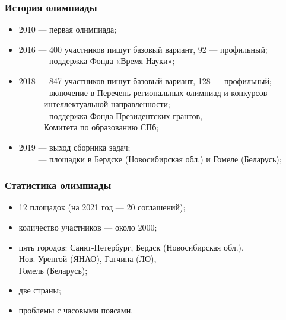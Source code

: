 % 

\begin{frame}\frametitle{История олимпиады}
\begin{itemize}
	\item 2010 — первая олимпиада;
	\item 2016 — 400 участников пишут базовый вариант, 92 --- профильный;\\
        $\phantom{2016}$ — поддержка Фонда «Время Науки»;
	\item 2018 — 847 участников пишут базовый вариант, 128 --- профильный;\\
        $\phantom{2018}$ — включение в Перечень региональных олимпиад и конкурсов\\
	$\phantom{2018 — }$\quad интеллектуальной направленности;\\
	$\phantom{2018}$ — поддержка Фонда Президентских грантов,\\
	$\phantom{2018 — }$\quad Комитета по образованию СПб;\\
	\item 2019 — выход сборника задач;\\
        $\phantom{2019}$ — площадки в Бердске (Новосибирская обл.) и Гомеле (Беларусь);\\
\end{itemize}\end{frame}

\begin{frame}\frametitle{Статистика олимпиады}
\begin{itemize}
	\item 12 площадок (на 2021 год — 20 соглашений);\\
	\item количество участников --- около 2000;\\
	\item пять городов: Санкт-Петербург, Бердск (Новосибирская обл.), \\
		Нов. Уренгой (ЯНАО), Гатчина (ЛО), \\
		Гомель (Беларусь);\\
	\item две страны;\\
	\item проблемы с часовыми поясами.
\end{itemize}\end{frame}

